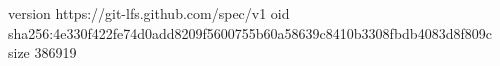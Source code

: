 version https://git-lfs.github.com/spec/v1
oid sha256:4e330f422fe74d0add8209f5600755b60a58639c8410b3308fbdb4083d8f809c
size 386919
